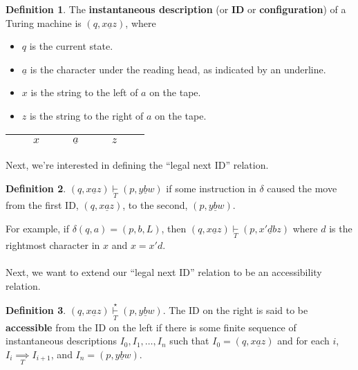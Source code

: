 \documentclass[]{article}
\theoremstyle{definition}
\newtheorem*{defn}{Definition}
\begin{document}
      \begin{defn}
        The \textbf{instantaneous description} (or \textbf{ID} or \textbf{configuration}) of a Turing machine is $(q, x \underline{a}z)$, where
        \begin{itemize}
          \item $q$ is the current state.
          \item $\underline{a}$ is the character under the reading head, as indicated by an underline.
          \item $x$ is the string to the left of $a$ on the tape.
          \item $z$ is the string to the right of $a$ on the tape.
        \end{itemize}

        \begin{center}
          \begin{tabular}{|ccccc|c|ccccc|}
            \hline
            & & $x$ & & & $\underline{a}$ & & & $z$ & & \\ \hline
          \end{tabular}
        \end{center}
      \end{defn}

    Next, we're interested in defining the ``legal next ID'' relation.

    \begin{defn}
      $(q, x\underline{a}z) \underset{T}{\vdash} (p, y\underline{b}w)$ if some instruction in $\delta$ caused the move from the first ID, $(q, x\underline{a}z)$, to the second, $(p, y\underline{b}w)$.
    \end{defn}

    For example, if $\delta(q, a) = (p, b, L)$, then $(q, x\underline{a}z) \underset{T}{\vdash} (p, x'\underline{d}bz)$ where $d$ is the rightmost character in $x$ and $x = x'd$.
    \\ \\
    Next, we want to extend our ``legal next ID'' relation to be an accessibility relation.

    \begin{defn}
      $(q, x\underline{a}z) \underset{T}{\overset{\star}{\vdash}} (p, y\underline{b}w)$. The ID on the right is said to be \textbf{accessible} from the ID on the left if there is some finite sequence of instantaneous descriptions $I_0, I_1, \ldots, I_n$ such that $I_0 = (q, x\underline{a}z)$ and for each $i$, $I_i \underset{T}{\implies} I_{i + 1}$, and $I_n = (p, y\underline{b}w)$.
    \end{defn}
\end{document}
